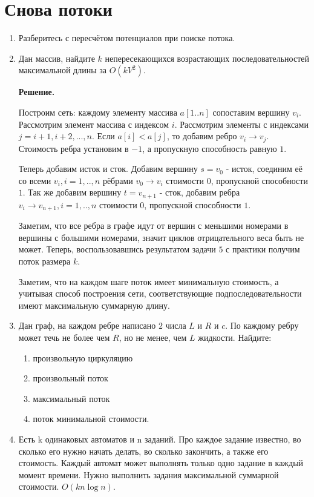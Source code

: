 \section*{Снова потоки}
\begin{enumerate}
	\item Разберитесь с пересчётом потенциалов при поиске потока.
	
	\item Дан массив, найдите $k$ непересекающихся возрастающих последовательностей максимальной длины за $O(kV^2)$.
	
	\textbf{Решение.}
	
	Построим сеть: каждому элементу массива $a[1..n]$ сопоставим вершину $v_i$. Рассмотрим элемент массива с 
	индексом $i$. Рассмотрим элементы с индексами $j = i + 1, i + 2, ..., n$. Если $a[i] < a[j]$, то добавим ребро 
	$v_i \to v_j$. Стоимость ребра установим в $-1$, а пропускную способность равную $1$. 
	
	Теперь добавим исток и сток. Добавим вершину $s = v_0$ - исток, соединим её со всеми $v_i, i = 1,..,n$ рёбрами 
	$v_0 \to v_i$ стоимости 0, пропускной способности $1$. Так же добавим вершину $t = v_{n + 1}$ - сток, добавим 
	ребра $v_i \to v_{n + 1}, i = 1,..,n$ стоимости $0$, пропускной способности $1$. 
	
	Заметим, что все ребра в графе идут от вершин с меньшими номерами в вершины с большими номерами, значит циклов 
	отрицательного веса быть не может. Теперь, воспользовавшись результатом задачи $5$ с практики получим поток 
	размера $k$. 
	
	Заметим, что на каждом шаге поток имеет минимальную стоимость, а учитывая способ построения сети, 
	соответствующие подпоследовательности имеют максимальную суммарную длину.
	
	\item Дан граф, на каждом ребре написано $2$ числа $L$ и $R$ и $c$. По каждому ребру может течь не более
	чем $R$, но не менее, чем $L$ жидкости. Найдите:
	\begin{enumerate}
		\item произвольную циркуляцию
		\item произвольный поток
		\item максимальный поток
		\item поток минимальной стоимости.
	\end{enumerate}
	
	\item Есть k одинаковых автоматов и n заданий. Про каждое задание известно, во сколько его нужно начать делать, во сколько закончить, а также его стоимость. Каждый автомат может выполнять только одно задание в каждый момент времени. Нужно выполнить задания максимальной суммарной стоимости. $O(kn \log n)$.
\end{enumerate}
